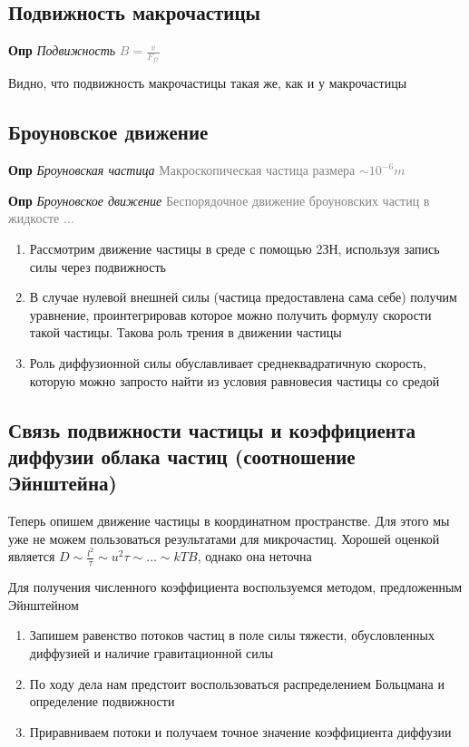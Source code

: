 \documentclass[a4paper, 14pt]{article}
\begin{document}
    \subsection{Подвижность макрочастицы}
    
    \textbf{Опр} \textit{Подвижность} \textcolor{gray}{$B = \frac{\overline{v}}{F_{fr}}$}
    
    Видно, что подвижность макрочастицы такая же, как и у макрочастицы
    
    \subsection{Броуновское движение}
    
    \textbf{Опр} \textit{Броуновская частица} \textcolor{gray}{Макроскопическая частица размера $\sim 10^{-6} m$}
    
    \textbf{Опр} \textit{Броуновское движение} \textcolor{gray}{Беспорядочное движение броуновских частиц в жидкосте ...}
    
    \begin{enumerate}
        \item Рассмотрим движение частицы в среде с помощью 2ЗН, используя запись силы через подвижность
        \item В случае нулевой внешней силы (частица предоставлена сама себе) получим уравнение, проинтегрировав
        которое можно получить формулу скорости такой частицы.
        Такова роль трения в движении частицы
        \item Роль диффузионной силы обуславливает среднеквадратичную скорость, которую можно запросто найти из условия
        равновесия частицы со средой
    \end{enumerate}
    
    \subsection{Связь подвижности частицы и коэффициента диффузии облака частиц (соотношение Эйнштейна)}
    
    Теперь опишем движение частицы в координатном пространстве.
    Для этого мы уже не можем пользоваться результатами для микрочастиц.
    Хорошей оценкой является $D \sim \frac{l^2}{\tau} \sim u^2 \tau \sim \dots \sim kTB$, однако она неточна
    
    Для получения численного коэффициента воспользуемся методом, предложенным Эйнштейном
    \begin{enumerate}
        \item Запишем равенство потоков частиц в поле силы тяжести, обусловленных диффузией и наличие гравитационной
        силы
        \item По ходу дела нам предстоит воспользоваться распределением Больцмана и определение подвижности
        \item Приравниваем потоки и получаем точное значение коэффициента диффузии
    \end{enumerate}
    
\end{document}
